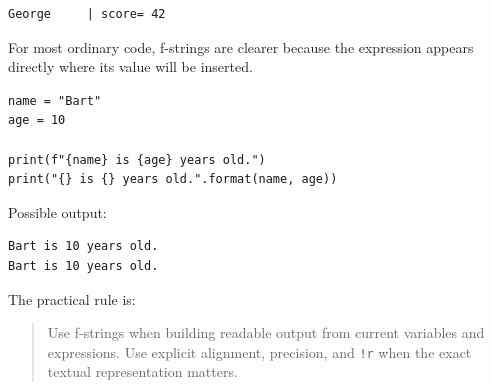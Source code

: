 \begin{verbatim}
George     | score= 42
\end{verbatim}

For most ordinary code, f-strings are clearer because the expression appears directly where its value will be inserted.

\begin{verbatim}
name = "Bart"
age = 10

print(f"{name} is {age} years old.")
print("{} is {} years old.".format(name, age))
\end{verbatim}

Possible output:

\begin{verbatim}
Bart is 10 years old.
Bart is 10 years old.
\end{verbatim}

The practical rule is:

\begin{quote}
Use f-strings when building readable output from current variables and expressions. Use explicit alignment, precision, and \texttt{!r} when the exact textual representation matters.
\end{quote}